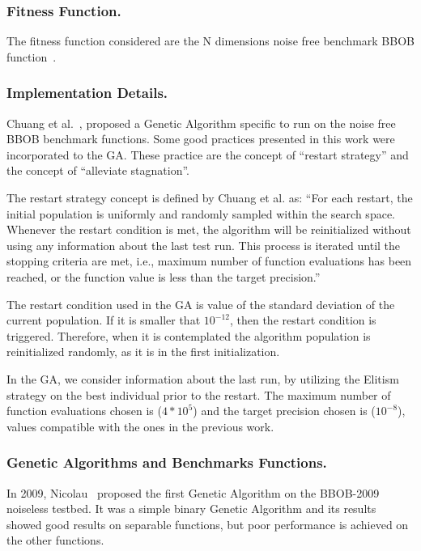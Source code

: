 \subsubsection*{Fitness Function.}
The fitness function considered are the N dimensions noise free benchmark BBOB function~\cite{hansen2010real}.


\subsubsection*{Implementation Details.}
Chuang et al.~\cite{chuang2012black}, proposed a Genetic Algorithm specific to run on the noise free BBOB benchmark functions. Some good practices presented in this work were incorporated to the GA. These practice are the concept of ``restart strategy'' and the concept of ``alleviate stagnation''.

The restart strategy concept is defined by Chuang et al. as: ``For each restart, the initial population  is uniformly and randomly sampled within the search space. Whenever the restart condition is met, the algorithm will be reinitialized without using any information about the last test run. This process is iterated until the stopping criteria are met, i.e., maximum number of function evaluations has been reached, or the function value is less than the target precision.''

The restart condition used in the GA is value of the standard deviation of the current population. If it is smaller that $10^{-12}$, then the restart condition is triggered. Therefore, when it is contemplated the algorithm population is reinitialized randomly, as it is in the first initialization. 

In the GA, we consider information about the last run, by utilizing the Elitism strategy on the best individual prior to the restart. The maximum number of function evaluations chosen is ($4 * 10^5$) and the target precision chosen is ($10^{-8}$), values compatible with the ones in the previous work.

\subsubsection*{Genetic Algorithms and Benchmarks Functions.}

In 2009, Nicolau~\cite{nicolau2009application} proposed the first Genetic Algorithm on the BBOB-2009 noiseless testbed. It was a simple binary Genetic Algorithm and its results showed good results on separable functions, but poor performance is achieved on the other functions.

